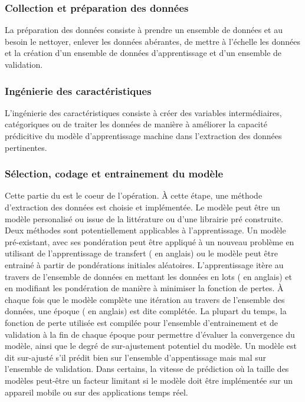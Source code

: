     \subsubsection{Collection et préparation des données}
        La préparation des données consiste à prendre un ensemble de données et au besoin le nettoyer, enlever les données abérantes, de mettre à l'échelle les données et la création d'un ensemble de données d'apprentissage et d'un ensemble de validation.
    \subsubsection{Ingénierie des caractéristiques}
      L'ingénierie des caractéristiques consiste à créer des variables intermédiaires, catégoriques ou de traiter les données de manière à améliorer la capacité prédicitive du modèle d'apprentissage machine dans l'extraction des données pertinentes.
    \subsubsection{Sélection, codage et entrainement du modèle}
      Cette partie du  \fg{} est le coeur de l'opération. À cette étape, une méthode d'extraction des données est choisie et implémentée. Le modèle peut être un modèle personalisé ou issue de la littérature ou d'une librairie pré construite. Deux méthodes sont potentiellement applicables à l'apprentissage. Un modèle pré-existant, avec ses pondération peut être appliqué à un nouveau problème en utilisant de l'apprentissage de transfert ( \fg{} en anglais) ou le modèle peut être entrainé à partir de pondérations initiales aléatoires. L'apprentissage itère au travers de l'ensemble de données en mettant les données en lots ( \fg{} en anglais) et en modifiant les pondération de manière à minimiser la fonction de pertes. À chaque fois que le modèle complète une itération au travers de l'ensemble des données, une époque ( \fg{} en anglais) est dite complétée. La plupart du temps, la fonction de perte utilisée est compilée pour l'ensemble d'entrainement et de validation à la fin de chaque époque pour permettre d'évaluer la convergence du modèle, ainsi que le degré de sur-ajustement potentiel du modèle. Un modèle est dit sur-ajusté s'il prédit bien sur l'ensemble d'appentissage mais mal sur l'ensemble de validation. Dans certains, la vitesse de prédiction où la taille des modèles peut-être un facteur limitant si le modèle doit être implémentée sur un appareil mobile ou sur des applications temps réel.
